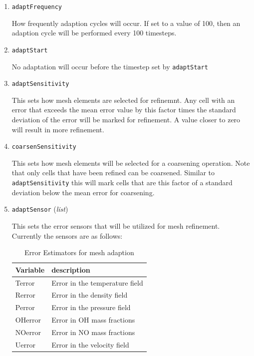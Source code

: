 \begin{enumerate}
\item {\tt adaptFrequency}

  How frequently adaption cycles will occur.  If set to a value of
  100, then an adaption cycle will be performed every 100 timesteps.

\item {\tt adaptStart}

  No adaptation will occur before the timestep set by {\tt adaptStart}

\item {\tt adaptSensitivity}

  This sets how mesh elements are selected for refinemnt.  Any cell
  with an error that exceeds the mean error value by this factor times
  the standard deviation of the error will be marked for refinement.
  A value closer to zero will result in more refinement.

\item {\tt coarsenSensitivity}

  This sets how mesh elements will be selected for a coarsening
  operation.  Note that only cells that have been refined can be
  coarsened.  Similar to {\tt adaptSensitivity} this will mark cells
  that are this factor of a standard deviation below the mean error
  for coarsening.

\item {\tt adaptSensor} ({\it list})

  This sets the error sensors that will be utilized for mesh
  refinement.  Currently the sensors are as follows:

  \begin{table}[htbp]

  \begin{centering}
    \leavevmode
  \begin{tabular}{|l|l|}
    \hline
    Variable & description \\
    \hline\hline
    Terror   & Error in the temperature field\\
    Rerror   & Error in the density field \\
    Perror   & Error in the pressure field \\
    OHerror  & Error in OH mass fractions\\
    NOerror  & Error in NO mass fractions\\
    Uerror   & Error in the velocity field\\
    \hline
  \end{tabular}
\caption{Error Estimators for mesh adaption}
  \label{tab:AMRerror}
  \end{centering}
\end{table}


\end{enumerate}
